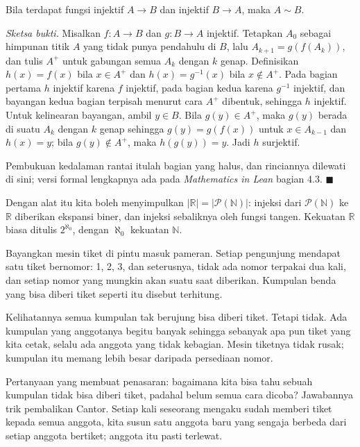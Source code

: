 \begin{proposisi}
Bila terdapat fungsi injektif $A \to B$ dan injektif $B \to A$, maka $A \sim B$.
\end{proposisi}
\par\smallskip\noindent\textit{Sketsa bukti.} Misalkan $f : A \to B$ dan
$g : B \to A$ injektif. Tetapkan $A_0$ sebagai himpunan titik $A$ yang tidak punya
pendahulu di $B$, lalu $A_{k+1} = g(f(A_k))$, dan tulis $A^{+}$ untuk gabungan semua
$A_k$ dengan $k$ genap. Definisikan $h(x) = f(x)$ bila $x \in A^{+}$ dan
$h(x) = g^{-1}(x)$ bila $x \notin A^{+}$. Pada bagian pertama $h$ injektif karena $f$
injektif, pada bagian kedua karena $g^{-1}$ injektif, dan bayangan kedua bagian
terpisah menurut cara $A^{+}$ dibentuk, sehingga $h$ injektif. Untuk kelinearan
bayangan, ambil $y \in B$. Bila $g(y) \in A^{+}$, maka $g(y)$ berada di suatu $A_k$
dengan $k$ genap sehingga $g(y) = g(f(x))$ untuk $x \in A_{k-1}$ dan $h(x) = y$; bila
$g(y) \notin A^{+}$, maka $h(g(y)) = y$. Jadi $h$ surjektif.

Pembukuan kedalaman rantai itulah bagian yang halus, dan rinciannya dilewati di sini;
versi formal lengkapnya ada pada \emph{Mathematics in Lean} bagian 4.3.
\hfill$\blacksquare${\parfillskip=0pt\par}

Dengan alat itu kita boleh menyimpulkan $|\mathbb{R}| = |\mathcal{P}(\mathbb{N})|$:
injeksi dari $\mathcal{P}(\mathbb{N})$ ke $\mathbb{R}$ diberikan ekspansi biner, dan
injeksi sebaliknya oleh fungsi tangen. Kekuatan $\mathbb{R}$ biasa ditulis
$2^{\aleph_0}$, dengan $\aleph_0$ kekuatan $\mathbb{N}$.

\begin{untukanak}
Bayangkan mesin tiket di pintu masuk pameran. Setiap pengunjung mendapat satu tiket
bernomor: 1, 2, 3, dan seterusnya, tidak ada nomor terpakai dua kali, dan setiap nomor
yang mungkin akan suatu saat diberikan. Kumpulan benda yang bisa diberi tiket seperti
itu disebut terhitung.

Kelihatannya semua kumpulan tak berujung bisa diberi tiket. Tetapi tidak. Ada
kumpulan yang anggotanya begitu banyak sehingga sebanyak apa pun tiket yang kita
cetak, selalu ada anggota yang tidak kebagian. Mesin tiketnya tidak rusak; kumpulan
itu memang lebih besar daripada persediaan nomor.

Pertanyaan yang membuat penasaran: bagaimana kita bisa tahu sebuah kumpulan tidak
bisa diberi tiket, padahal belum semua cara dicoba? Jawabannya trik pembalikan Cantor.
Setiap kali seseorang mengaku sudah memberi tiket kepada semua anggota, kita susun satu
anggota baru yang sengaja berbeda dari setiap anggota bertiket; anggota itu pasti
terlewat.
\end{untukanak}

